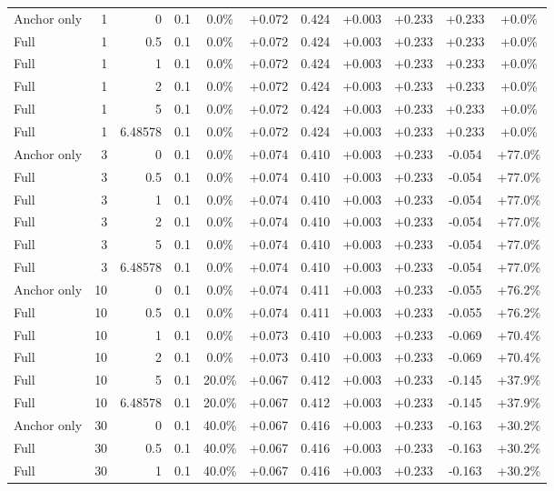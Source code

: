 \begin{table}[htbp]
\begin{tabular}{lrrrccccccc}
Anchor only & 1 & 0 & 0.1 & 0.0\% & +0.072 & 0.424 & +0.003 & +0.233 & +0.233 & +0.0\% \\
Full & 1 & 0.5 & 0.1 & 0.0\% & +0.072 & 0.424 & +0.003 & +0.233 & +0.233 & +0.0\% \\
Full & 1 & 1 & 0.1 & 0.0\% & +0.072 & 0.424 & +0.003 & +0.233 & +0.233 & +0.0\% \\
Full & 1 & 2 & 0.1 & 0.0\% & +0.072 & 0.424 & +0.003 & +0.233 & +0.233 & +0.0\% \\
Full & 1 & 5 & 0.1 & 0.0\% & +0.072 & 0.424 & +0.003 & +0.233 & +0.233 & +0.0\% \\
Full & 1 & 6.48578 & 0.1 & 0.0\% & +0.072 & 0.424 & +0.003 & +0.233 & +0.233 & +0.0\% \\
Anchor only & 3 & 0 & 0.1 & 0.0\% & +0.074 & 0.410 & +0.003 & +0.233 & -0.054 & +77.0\% \\
Full & 3 & 0.5 & 0.1 & 0.0\% & +0.074 & 0.410 & +0.003 & +0.233 & -0.054 & +77.0\% \\
Full & 3 & 1 & 0.1 & 0.0\% & +0.074 & 0.410 & +0.003 & +0.233 & -0.054 & +77.0\% \\
Full & 3 & 2 & 0.1 & 0.0\% & +0.074 & 0.410 & +0.003 & +0.233 & -0.054 & +77.0\% \\
Full & 3 & 5 & 0.1 & 0.0\% & +0.074 & 0.410 & +0.003 & +0.233 & -0.054 & +77.0\% \\
Full & 3 & 6.48578 & 0.1 & 0.0\% & +0.074 & 0.410 & +0.003 & +0.233 & -0.054 & +77.0\% \\
Anchor only & 10 & 0 & 0.1 & 0.0\% & +0.074 & 0.411 & +0.003 & +0.233 & -0.055 & +76.2\% \\
Full & 10 & 0.5 & 0.1 & 0.0\% & +0.074 & 0.411 & +0.003 & +0.233 & -0.055 & +76.2\% \\
Full & 10 & 1 & 0.1 & 0.0\% & +0.073 & 0.410 & +0.003 & +0.233 & -0.069 & +70.4\% \\
Full & 10 & 2 & 0.1 & 0.0\% & +0.073 & 0.410 & +0.003 & +0.233 & -0.069 & +70.4\% \\
Full & 10 & 5 & 0.1 & 20.0\% & +0.067 & 0.412 & +0.003 & +0.233 & -0.145 & +37.9\% \\
Full & 10 & 6.48578 & 0.1 & 20.0\% & +0.067 & 0.412 & +0.003 & +0.233 & -0.145 & +37.9\% \\
Anchor only & 30 & 0 & 0.1 & 40.0\% & +0.067 & 0.416 & +0.003 & +0.233 & -0.163 & +30.2\% \\
Full & 30 & 0.5 & 0.1 & 40.0\% & +0.067 & 0.416 & +0.003 & +0.233 & -0.163 & +30.2\% \\
Full & 30 & 1 & 0.1 & 40.0\% & +0.067 & 0.416 & +0.003 & +0.233 & -0.163 & +30.2\% \\

\end{tabular}
\end{table}
